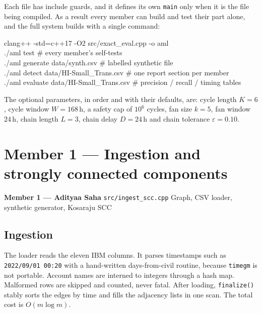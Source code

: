 \documentclass[11pt,a4paper]{article}
\theoremstyle{definition}
\begin{document}
Each file has include guards, and it defines its own \texttt{main} only when it is the file being compiled. As a result every member can build and test their part alone, and the full system builds with a single command:

\begin{codebox}
\small\ttfamily
clang++ -std=c++17 -O2 src/exact\_eval.cpp -o aml\\
./aml test \hspace{3.6cm}\# every member's self-tests\\
./aml generate data/synth.csv \hspace{1.35cm}\# labelled synthetic file\\
./aml detect \hspace{0.2cm} data/HI-Small\_Trans.csv \hspace{-0.05cm}\# one report section per member\\
./aml evaluate data/HI-Small\_Trans.csv \hspace{-0.05cm}\# precision / recall / timing tables
\end{codebox}

\noindent
The optional parameters, in order and with their defaults, are: cycle length $K = 6$, cycle window $W = 168\,\text{h}$, a safety cap of $10^6$ cycles, fan size $k = 5$, fan window $24\,\text{h}$, chain length $L = 3$, chain delay $D = 24\,\text{h}$ and chain tolerance $\varepsilon = 0.10$.

\newpage
\section{Member 1 --- Ingestion and strongly connected components}

\begin{memberstrip}
\small\textbf{Member 1 --- Adityaa Saha} \hfill \texttt{src/ingest\_scc.cpp} \quad Graph, CSV loader, synthetic generator, Kosaraju SCC
\end{memberstrip}

\subsection{Ingestion}
The loader reads the eleven IBM columns. It parses timestamps such as \texttt{2022/09/01 00:20} with a hand-written days-from-civil routine, because \texttt{timegm} is not portable. Account names are interned to integers through a hash map. Malformed rows are skipped and counted, never fatal. After loading, \texttt{finalize()} stably sorts the edges by time and fills the adjacency lists in one scan. The total cost is $O(m \log m)$.
\end{document}
